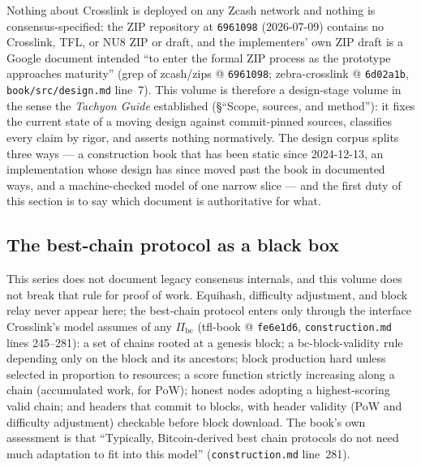 \documentclass[11pt,a4paper]{article}
\theoremstyle{definition}
\begin{document}
Nothing about Crosslink is deployed on any Zcash network and nothing is
consensus-specified: the ZIP repository at \texttt{6961098} (2026-07-09)
contains no Crosslink, TFL, or NU8 ZIP or draft, and the implementers'
own ZIP draft is a Google document intended ``to enter the formal ZIP
process as the prototype approaches maturity'' (grep of zcash/zips @
\texttt{6961098}; zebra-crosslink @ \texttt{6d02a1b},
\texttt{book/src/design.md} line~7). This volume is therefore a
design-stage volume in the sense the \emph{Tachyon Guide} established
(\S``Scope, sources, and method''): it fixes the current state of a
moving design against commit-pinned sources, classifies every claim by
rigor, and asserts nothing normatively. The design corpus splits three
ways --- a construction book that has been static since 2024-12-13, an
implementation whose design has since moved past the book in documented
ways, and a machine-checked model of one narrow slice --- and the first
duty of this section is to say which document is authoritative for what.

\subsection{The best-chain protocol as a black box}\label{sec:xl-blackbox}

This series does not document legacy consensus internals, and this
volume does not break that rule for proof of work. Equihash, difficulty
adjustment, and block relay never appear here; the best-chain protocol
enters only through the interface Crosslink's model assumes of any
$\Pi_{\mathrm{bc}}$ (tfl-book @ \texttt{fe6e1d6},
\texttt{construction.md} lines 245--281): a set of chains rooted at a
genesis block; a bc-block-validity rule depending only on the block and
its ancestors; block production hard unless selected in proportion to
resources; a score function strictly increasing along a chain
(accumulated work, for PoW); honest nodes adopting a highest-scoring
valid chain; and headers that commit to blocks, with header validity
(PoW and difficulty adjustment) checkable before block download. The
book's own assessment is that ``Typically, Bitcoin-derived best chain
protocols do not need much adaptation to fit into this model''
(\texttt{construction.md} line~281).
\end{document}
